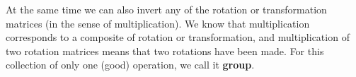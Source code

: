 At the same time we can also invert any of the rotation or transformation matrices (in the sense of multiplication).
We know that multiplication corresponds to a composite of rotation or transformation, and multiplication of two rotation matrices means that two rotations have been made.
For this collection of only one (good) operation, we call it \textbf {group}.











